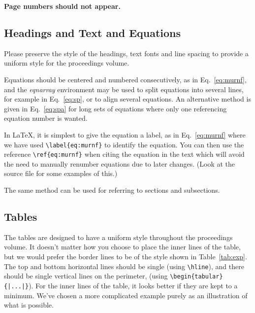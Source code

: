 \documentclass{moriond}
\begin{document}
{\bf Page numbers should not appear.}

\subsection{Headings and Text and Equations}

Please preserve the style of the
headings, text fonts and line spacing to provide a
uniform style for the proceedings volume.

Equations should be centered and numbered consecutively, as in
Eq.~\ref{eq:murnf}, and the {\em eqnarray} environment may be used to
split equations into several lines, for example in Eq.~\ref{eq:sp},
or to align several equations.
An alternative method is given in Eq.~\ref{eq:spa} for long sets of
equations where only one referencing equation number is wanted.

In \LaTeX, it is simplest to give the equation a label, as in
Eq.~\ref{eq:murnf}
where we have used \verb^\label{eq:murnf}^ to identify the
equation. You can then use the reference \verb^\ref{eq:murnf}^
when citing the equation in the
text which will avoid the need to manually renumber equations due to
later changes. (Look at
the source file for some examples of this.)

The same method can be used for referring to sections and subsections.

\subsection{Tables}

The tables are designed to have a uniform style throughout the proceedings
volume. It doesn't matter how you choose to place the inner
lines of the table, but we would prefer the border lines to be of the style
shown in Table~\ref{tab:exp}.
 The top and bottom horizontal
lines should be single (using \verb^\hline^), and
there should be single vertical lines on the perimeter,
(using \verb^\begin{tabular}{|...|}^).
 For the inner lines of the table, it looks better if they are
kept to a minimum. We've chosen a more complicated example purely as
an illustration of what is possible.
\end{document}
